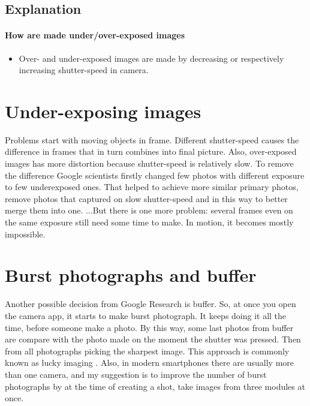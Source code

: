\documentclass[10pt,twoside,english,a4paper]{article}
\begin{document}
\subsection{Explanation} \label{ina:este}

\paragraph{How are made under/over-exposed images}
\begin{itemize}
	\item Over- and under-exposed images are made by decreasing
	      or respectively increasing shutter-speed in camera.
\end{itemize}



\section{Under-exposing images} \label{dolezita}

Problems start with moving objects in frame. Different shutter-speed causes
the difference in frames that in turn combines into final picture. 
Also, over-exposed images has more distortion because shutter-speed 
is relatively slow.
To remove the difference Google \cite{Google}
scientists
firstly changed few photos with different exposure to few underexposed ones.
That helped to achieve more similar primary photos, remove photos that 
captured on slow shutter-speed and in this way to better merge them into one.
\newline ...But there is one more problem: several frames even on the same exposure
still need some time to make. In motion, it becomes mostly impossible.



\section{Burst photographs and buffer} \label{dolezitejsia}
Another possible decision from Google Research is buffer. So, at once
you open the camera app, it starts to make burst photograph. \cite{Burst}
It keeps doing it all the time, before someone make a photo. 
By this way, some last photos from buffer are compare with the photo made on 
the moment the shutter was pressed. Then from all photographs picking the 
sharpest image. This approach is commonly known as 
lucky imaging  \cite{LuckySharp}. 
\newline Also, in modern smartphones there are usually more than one camera, 
and my suggestion is to improve the number of burst photographs by 
at the time of creating a shot, take images from three modules at once.
\end{document}
